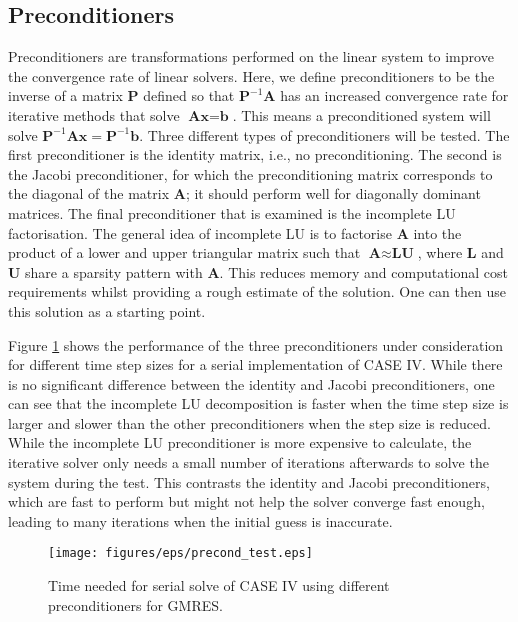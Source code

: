 \subsection{Preconditioners}
Preconditioners are transformations performed on the linear system to improve the convergence rate of linear solvers. Here, we define preconditioners to be the inverse of a matrix $\textbf{P}$ defined so that $\textbf{P}^{-1}\textbf{A}$ has an increased convergence rate for iterative methods that solve $\textbf{Ax} = \textbf{b}$. This means a preconditioned system will solve $\textbf{P}^{-1}\textbf{Ax} = \textbf{P}^{-1}\textbf{b}$. Three different types of preconditioners will be tested. The first preconditioner is the identity matrix, i.e., no preconditioning. The second is the Jacobi preconditioner, for which the preconditioning matrix corresponds to the diagonal of the matrix $\textbf{A}$; it should perform well for diagonally dominant matrices. The final preconditioner that is examined is the incomplete LU factorisation. The general idea of incomplete LU is to factorise $\textbf{A}$ into the product of a lower and upper triangular matrix such that $\textbf{A} \approx \textbf{LU}$, where $\textbf{L}$ and $\textbf{U}$ share a sparsity pattern with $\textbf{A}$. This reduces memory and computational cost requirements whilst providing a rough estimate of the solution. One can then use this solution as a starting point.

Figure \ref{fig: preconditioners} shows the performance of the three preconditioners under consideration for different time step sizes for a serial implementation of CASE IV. While there is no significant difference between the identity and Jacobi preconditioners, one can see that the incomplete LU decomposition is faster when the time step size is larger and slower than the other preconditioners when the step size is reduced. While the incomplete LU preconditioner is more expensive to calculate, the iterative solver only needs a small number of iterations afterwards to solve the system during the test. This contrasts the identity and Jacobi preconditioners, which are fast to perform but might not help the solver converge fast enough, leading to many iterations when the initial guess is inaccurate.
 \begin{figure}[h]
    \centering
    \texttt{[image: figures/eps/precond\_test.eps]}
    \caption{Time needed for serial solve of CASE IV using different preconditioners for GMRES.}
    \label{fig: preconditioners}
\end{figure}

